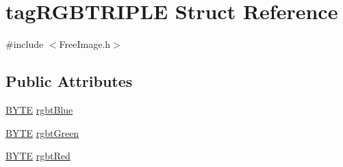 \hypertarget{structtag_r_g_b_t_r_i_p_l_e}{\section{tag\-R\-G\-B\-T\-R\-I\-P\-L\-E Struct Reference}
\label{structtag_r_g_b_t_r_i_p_l_e}
}


{\ttfamily \#include $<$Free\-Image.\-h$>$}

\subsection*{Public Attributes}
\begin{DoxyCompactItemize}
\item 
\hyperlink{_free_image_8h_aae9749d96e15ccb4f482dd5f55d98f9b}{B\-Y\-T\-E} \hyperlink{structtag_r_g_b_t_r_i_p_l_e_adbebf9e7802cdfffbdae31c08a71dab7}{rgbt\-Blue}
\item 
\hyperlink{_free_image_8h_aae9749d96e15ccb4f482dd5f55d98f9b}{B\-Y\-T\-E} \hyperlink{structtag_r_g_b_t_r_i_p_l_e_a2e3e106422819352693de65189cc341f}{rgbt\-Green}
\item 
\hyperlink{_free_image_8h_aae9749d96e15ccb4f482dd5f55d98f9b}{B\-Y\-T\-E} \hyperlink{structtag_r_g_b_t_r_i_p_l_e_ae61b0771fd3e1e267a3495dcfba5e21c}{rgbt\-Red}
\end{DoxyCompactItemize}


